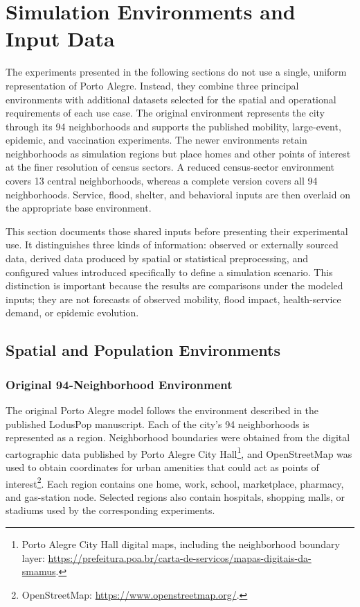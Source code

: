 \section{Simulation Environments and Input Data}
\label{sec:simulation_environments_and_data}

The experiments presented in the following sections do not use a single, uniform representation of Porto Alegre. Instead, they combine three principal environments with additional datasets selected for the spatial and operational requirements of each use case. The original environment represents the city through its 94 neighborhoods and supports the published mobility, large-event, epidemic, and vaccination experiments. The newer environments retain neighborhoods as simulation regions but place homes and other points of interest at the finer resolution of census sectors. A reduced census-sector environment covers 13 central neighborhoods, whereas a complete version covers all 94 neighborhoods. Service, flood, shelter, and behavioral inputs are then overlaid on the appropriate base environment.

This section documents those shared inputs before presenting their experimental use. It distinguishes three kinds of information: observed or externally sourced data, derived data produced by spatial or statistical preprocessing, and configured values introduced specifically to define a simulation scenario. This distinction is important because the results are comparisons under the modeled inputs; they are not forecasts of observed mobility, flood impact, health-service demand, or epidemic evolution.

\subsection{Spatial and Population Environments}
\label{sec:spatial_population_environments}

\subsubsection{Original 94-Neighborhood Environment}

The original Porto Alegre model follows the environment described in the published LodusPop manuscript. Each of the city's 94 neighborhoods is represented as a region. Neighborhood boundaries were obtained from the digital cartographic data published by Porto Alegre City Hall\footnote{Porto Alegre City Hall digital maps, including the neighborhood boundary layer: \url{https://prefeitura.poa.br/carta-de-servicos/mapas-digitais-da-smamus}.}, and OpenStreetMap was used to obtain coordinates for urban amenities that could act as points of interest\footnote{OpenStreetMap: \url{https://www.openstreetmap.org/}.}. Each region contains one home, work, school, marketplace, pharmacy, and gas-station node. Selected regions also contain hospitals, shopping malls, or stadiums used by the corresponding experiments.

